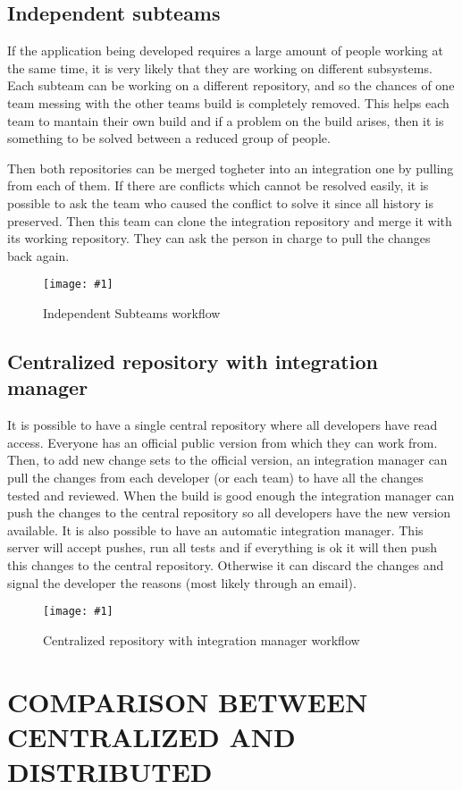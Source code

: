 \documentclass[a4paper,10pt]{article}
\newcommand{\diagrama}[2]{
    \begin{figure}[h]
        \begin{center}
            \texttt{[image: \#1]} 
        \end{center}
        \caption{#2}
    \end{figure}
}
\begin{document}
\subsection{Independent subteams}
If the application being developed requires a large amount of people working at the same time, it is very likely that they are working on different subsystems. Each subteam can be working on a different repository, and so the chances of one team messing with the other teams build is completely removed. This helps each team to mantain their own build and if a problem on the build arises, then it is something to be solved between a reduced group of people.

Then both repositories can be merged togheter into an integration one by pulling from each of them. If there are conflicts which cannot be resolved easily, it is possible to ask the team who caused the conflict to solve it since all history is preserved. Then this team can clone the integration repository and merge it with its working repository. They can ask the person in charge to pull the changes back again.

\diagrama{IndependentSubteams.jpg}{Independent Subteams workflow}


\subsection{Centralized repository with integration manager}
It is possible to have a single central repository where all developers have read access. Everyone has an official public version from which they can work from. Then, to add new change sets to the official version, an integration manager can pull the changes from each developer (or each team) to have all the changes tested and reviewed. When the build is good enough the integration manager can push the changes to the central repository so all developers have the new version available.
It is also possible to have an automatic integration manager. This server will accept pushes, run all tests and if everything is ok it will then push this changes to the central repository. Otherwise it can discard the changes and signal the developer the reasons (most likely through an email).

\diagrama{ResponsableIntegracion.jpg}{Centralized repository with integration manager workflow}



\section{COMPARISON BETWEEN CENTRALIZED AND DISTRIBUTED}
\label{CENTRALIZED DISTRIBUTED COMPARISON}
\end{document}
